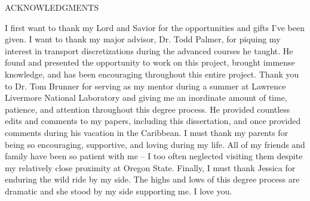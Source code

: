 \documentclass[12pt]{article}
\begin{document}
\begin{center}
ACKNOWLEDGMENTS
\end{center}

I first want to thank my Lord and Savior for the opportunities and gifts I've been given. I want to thank my major advisor, Dr. Todd Palmer, for piquing my interest in transport discretizations during the advanced courses he taught. He found and presented the opportunity to work on this project, brought immense knowledge, and has been encouraging throughout this entire project. Thank you to Dr. Tom Brunner for serving as my mentor during a summer at Lawrence Livermore National Laboratory and giving me an inordinate amount of time, patience, and attention throughout this degree process. He provided countless edits and comments to my papers, including this dissertation, and once provided comments during his vacation in the Caribbean. I must thank my parents for being so encouraging, supportive, and loving during my life. All of my friends and family have been so patient with me -- I too often neglected visiting them despite my relatively close proximity at Oregon State. Finally, I must thank Jessica for enduring the wild ride by my side. The highs and lows of this degree process are dramatic and she stood by my side supporting me. I love you.
\end{document}
